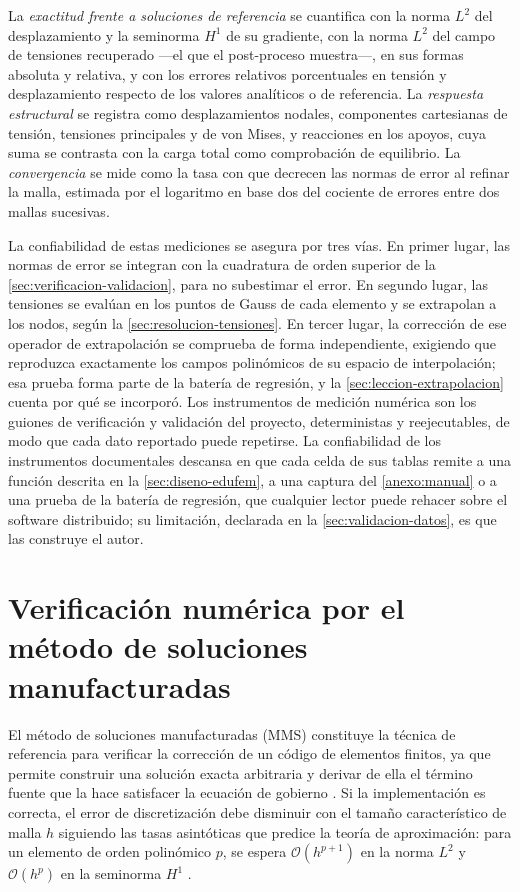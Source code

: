 La \emph{exactitud frente a soluciones de referencia} se cuantifica con la norma $L^2$ del desplazamiento y la seminorma $H^1$ de su gradiente, con la norma $L^2$ del campo de tensiones recuperado —el que el post-proceso muestra—, en sus formas absoluta y relativa, y con los errores relativos porcentuales en tensión y desplazamiento respecto de los valores analíticos o de referencia. La \emph{respuesta estructural} se registra como desplazamientos nodales, componentes cartesianas de tensión, tensiones principales y de von Mises, y reacciones en los apoyos, cuya suma se contrasta con la carga total como comprobación de equilibrio. La \emph{convergencia} se mide como la tasa con que decrecen las normas de error al refinar la malla, estimada por el logaritmo en base dos del cociente de errores entre dos mallas sucesivas.

La confiabilidad de estas mediciones se asegura por tres vías. En primer lugar, las normas de error se integran con la cuadratura de orden superior de la \autoref{sec:verificacion-validacion}, para no subestimar el error. En segundo lugar, las tensiones se evalúan en los puntos de Gauss de cada elemento y se extrapolan a los nodos, según la \autoref{sec:resolucion-tensiones}. En tercer lugar, la corrección de ese operador de extrapolación se comprueba de forma independiente, exigiendo que reproduzca exactamente los campos polinómicos de su espacio de interpolación; esa prueba forma parte de la batería de regresión, y la \autoref{sec:leccion-extrapolacion} cuenta por qué se incorporó. Los instrumentos de medición numérica son los guiones de verificación y validación del proyecto, deterministas y reejecutables, de modo que cada dato reportado puede repetirse. La confiabilidad de los instrumentos documentales descansa en que cada celda de sus tablas remite a una función descrita en la \autoref{sec:diseno-edufem}, a una captura del \autoref{anexo:manual} o a una prueba de la batería de regresión, que cualquier lector puede rehacer sobre el software distribuido; su limitación, declarada en la \autoref{sec:validacion-datos}, es que las construye el autor.

\section{Verificación numérica por el método de soluciones manufacturadas}
\label{sec:mms}

El método de soluciones manufacturadas (MMS) constituye la técnica de referencia para verificar la corrección de un código de elementos finitos, ya que permite construir una solución exacta arbitraria y derivar de ella el término fuente que la hace satisfacer la ecuación de gobierno \autocites[pp.~219-222]{oberkampf2010vv}[pp.~20-21]{salari2000mms}. Si la implementación es correcta, el error de discretización debe disminuir con el tamaño característico de malla $h$ siguiendo las tasas asintóticas que predice la teoría de aproximación: para un elemento de orden polinómico $p$, se espera $\mathcal{O}(h^{p+1})$ en la norma $L^2$ y $\mathcal{O}(h^{p})$ en la seminorma $H^1$ \autocites[pp.~106-107]{strang2008analysis}[pp.~189-190]{hughes2000fem}[p.~38]{zienkiewicz2013fem}.

